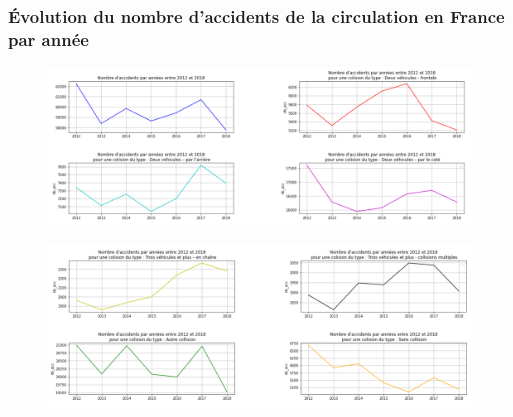 \documentclass{beamer}
\theoremstyle{definition}
\begin{document}
\begin{frame}
	\frametitle{Évolution du nombre d'accidents de la circulation en France par année}
	\centering
	\begin{minipage}[c]{0.8\linewidth}\centering\begin{figure}

				\includegraphics[width=1\linewidth]{evo1.png}
		\end{figure}
	\end{minipage}
	
		\begin{minipage}[t]{0.8\linewidth}\centering\begin{figure}
				\begin{center}
					\includegraphics[width=1\linewidth]{evo2.png}			
				\end{center}
				
		\end{figure}\end{minipage}	
\end{frame}
\end{document}
